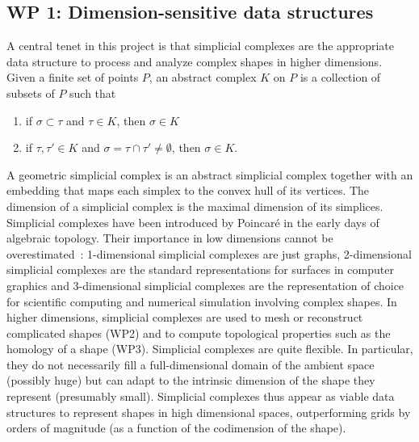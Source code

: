 \subsection*{WP 1:  Dimension-sensitive data structures} 

A central tenet in this project is that simplicial complexes are the appropriate data structure
to process and analyze complex shapes in higher dimensions. Given a finite set of points $P$, an abstract complex $K$ on $P$ is a collection of subsets of $P$ such that 
\begin{enumerate}
\item if $\sigma\subset \tau$ and $\tau\in K$, then $\sigma \in K$
\item if $\tau, \tau'\in K$ and $\sigma = \tau\cap \tau'\neq\emptyset$, then $\sigma\in K$.
\end{enumerate}
A geometric simplicial complex is an abstract simplicial complex together with an embedding that maps each simplex to the convex hull of its vertices. The dimension of a simplicial complex is the maximal dimension of its simplices. Simplicial complexes have been introduced by Poincar\'e in the early days of algebraic topology. Their importance in low dimensions cannot be overestimated~: 1-dimensional simplicial complexes are just graphs, 2-dimensional simplicial complexes are the standard representations for surfaces in computer graphics and 3-dimensional simplicial complexes are the representation of choice for scientific computing and numerical simulation involving complex shapes. In higher dimensions, simplicial complexes are used to mesh or reconstruct complicated shapes (WP2) and to compute topological properties such as the homology of a shape (WP3). Simplicial complexes are quite flexible. In particular, they do not necessarily fill a full-dimensional domain of the ambient space (possibly huge) but  can adapt to the intrinsic dimension of the shape they represent (presumably small).  Simplicial complexes thus appear as viable data structures to represent shapes in high dimensional spaces, outperforming  grids by orders of magnitude (as a function of the codimension of the shape). 

